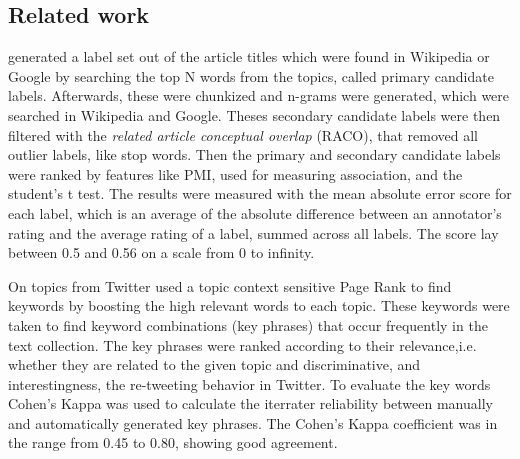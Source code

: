 \subsection{Related work}                                                
\label{sec:relWorl: atl}
\textit{\cite{Lau2011}} generated a label set out of the article titles which were found in Wikipedia or Google by searching the top N words from the topics, called primary candidate labels. Afterwards, these were chunkized and n-grams were generated, which were searched in Wikipedia and Google. Theses secondary candidate labels were then filtered with the \textit{related article conceptual overlap} (RACO), that removed all outlier labels, like stop words. Then the primary and secondary candidate labels were ranked by features like \ac{PMI}, used for measuring association, and the student’s t test. The results were measured with the mean absolute error score for each label, which is an average of the absolute difference between an annotator’s rating and the average rating of a label, summed across all labels. The score lay between 0.5 and 0.56 on a scale from 0 to infinity.

On topics from Twitter \textit{\cite{Zhao2011}} used  a topic context sensitive Page Rank to find keywords by boosting the high relevant words to each topic. These keywords were taken to find keyword combinations (key phrases) that occur frequently in the text collection. The key phrases were ranked according to their relevance,i.e. whether they are related to the given topic and discriminative, and interestingness, the re-tweeting behavior in Twitter. To evaluate the key words Cohen’s Kappa was used to calculate the iterrater reliability between manually and automatically generated key phrases. The Cohen’s Kappa coefficient was in the range from 0.45 to 0.80, showing good agreement.

